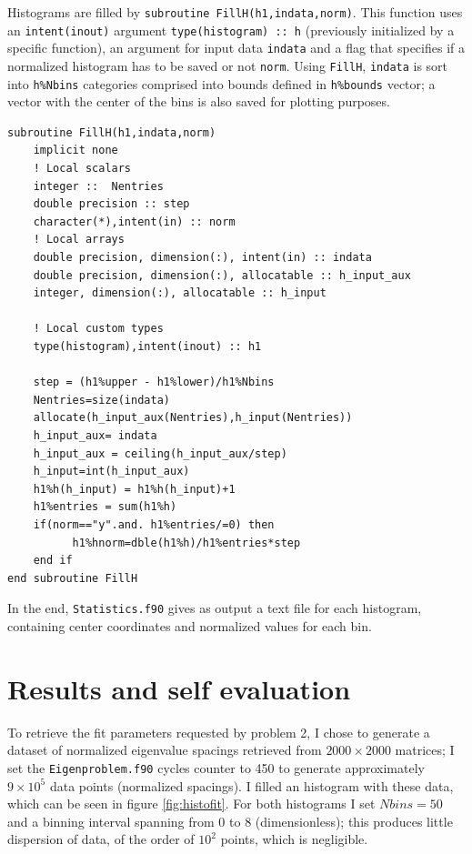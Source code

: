 \documentclass[a4paper]{article}
\begin{document}
Histograms are filled by \lstinline{subroutine FillH(h1,indata,norm)}.
This function uses an \lstinline{intent(inout)} argument \lstinline{type(histogram) :: h} (previously initialized by a specific function), an argument for input data \lstinline{indata} and a flag that specifies if a normalized histogram has to be saved or not \lstinline{norm}.
Using \lstinline{FillH}, \lstinline{indata} is sort into \lstinline{h%Nbins} categories comprised into bounds defined in \lstinline{h%bounds} vector; a vector with the center of the bins is also saved for plotting purposes.
\begin{lstlisting}
subroutine FillH(h1,indata,norm)
    implicit none
    ! Local scalars
    integer ::  Nentries
    double precision :: step
    character(*),intent(in) :: norm
    ! Local arrays
    double precision, dimension(:), intent(in) :: indata
    double precision, dimension(:), allocatable :: h_input_aux
    integer, dimension(:), allocatable :: h_input

    ! Local custom types
    type(histogram),intent(inout) :: h1

    step = (h1%upper - h1%lower)/h1%Nbins
    Nentries=size(indata)
    allocate(h_input_aux(Nentries),h_input(Nentries))
    h_input_aux= indata
    h_input_aux = ceiling(h_input_aux/step)
    h_input=int(h_input_aux)
    h1%h(h_input) = h1%h(h_input)+1
    h1%entries = sum(h1%h)
    if(norm=="y".and. h1%entries/=0) then
          h1%hnorm=dble(h1%h)/h1%entries*step
    end if
end subroutine FillH
\end{lstlisting}

In the end, \lstinline{Statistics.f90} gives as output a text file for each histogram, containing center coordinates and normalized values for each bin.




\section*{Results and self evaluation}
To retrieve the fit parameters requested by problem 2, I chose to generate a dataset of normalized eigenvalue spacings retrieved from $2000\times2000$ matrices; I set the \lstinline{Eigenproblem.f90} cycles counter to 450 to generate approximately $9\times10^5$ data points (normalized spacings).
I filled an histogram with these data, which can be seen in figure \ref{fig:histofit}.
For both histograms I set $Nbins=50$ and a binning interval spanning from 0 to 8 (dimensionless); this produces little dispersion of data, of the order of $10^2$ points, which is negligible.
\end{document}
